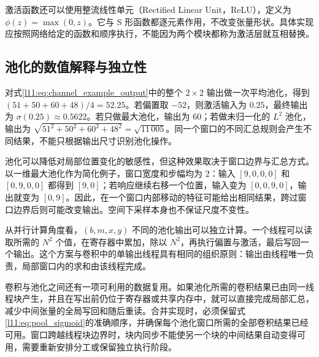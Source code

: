 激活函数还可以使用整流线性单元（Rectified Linear Unit，ReLU），定义为 $\phi(z)=\max(0,z)$。它与 S 形函数都逐元素作用，不改变张量形状。具体实现应按照网络给定的函数和顺序执行，不能因为两个模块都称为激活层就互相替换。

\subsection{池化的数值解释与独立性}

对式\eqref{l11:eq:channel_example_output}中的整个 $2\times2$ 输出做一次平均池化，得到 $(51+50+60+48)/4=52.25$。若偏置取 $-52$，则激活输入为 $0.25$，最终输出为 $\sigma(0.25)\approx0.5622$。若只做最大池化，输出为 $60$；若做未归一化的 $L^2$ 池化，输出为 $\sqrt{51^2+50^2+60^2+48^2}=\sqrt{11\,005}$。同一个窗口的不同汇总规则会产生不同结果，不能只根据输出尺寸识别池化操作。

池化可以降低对局部位置变化的敏感性，但这种效果取决于窗口边界与汇总方式。以一维最大池化作为简化例子，窗口宽度和步幅均为 $2$：输入 $[9,0,0,0]$ 和 $[0,9,0,0]$ 都得到 $[9,0]$；若响应继续右移一个位置，输入变为 $[0,0,9,0]$，输出就变为 $[0,9]$。因此，在一个窗口内部移动的特征可能给出相同结果，跨过窗口边界后则可能改变输出。空间下采样本身也不保证尺度不变性。

从并行计算角度看，$(b,m,x,y)$ 不同的池化输出可以独立计算。一个线程可以读取所需的 $N^2$ 个值，在寄存器中累加，除以 $N^2$，再执行偏置与激活，最后写回一个输出。这个方案与卷积中的单输出线程具有相同的组织原则：输出由线程唯一负责，局部窗口内的求和由该线程完成。

卷积与池化之间还有一项可利用的数据复用。如果池化所需的卷积结果已由同一线程块产生，并且在写出前仍位于寄存器或共享内存中，就可以直接完成局部汇总，减少中间张量的全局写回和随后重读。合并实现时，必须保留式\eqref{l11:eq:pool_sigmoid}的准确顺序，并确保每个池化窗口所需的全部卷积结果已经可用。窗口跨越线程块边界时，块内同步不能使另一个块的中间结果自动变得可用，需要重新安排分工或保留独立执行阶段。
